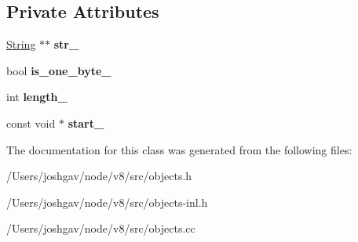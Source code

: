 \subsection*{Private Attributes}
\begin{DoxyCompactItemize}
\item 
\hyperlink{classv8_1_1internal_1_1_string}{String} $\ast$$\ast$ {\bfseries str\+\_\+}\hypertarget{classv8_1_1internal_1_1_flat_string_reader_a6a9b34e1e6fc9c1cf385932fa4fe452c}{}\label{classv8_1_1internal_1_1_flat_string_reader_a6a9b34e1e6fc9c1cf385932fa4fe452c}

\item 
bool {\bfseries is\+\_\+one\+\_\+byte\+\_\+}\hypertarget{classv8_1_1internal_1_1_flat_string_reader_a0679192f9ea46ae9d76b6c3af5a365e1}{}\label{classv8_1_1internal_1_1_flat_string_reader_a0679192f9ea46ae9d76b6c3af5a365e1}

\item 
int {\bfseries length\+\_\+}\hypertarget{classv8_1_1internal_1_1_flat_string_reader_a2418d25a56bebb00d3b71e0c65ecf88a}{}\label{classv8_1_1internal_1_1_flat_string_reader_a2418d25a56bebb00d3b71e0c65ecf88a}

\item 
const void $\ast$ {\bfseries start\+\_\+}\hypertarget{classv8_1_1internal_1_1_flat_string_reader_a7cde379222e1f1c63eca0b97223138a1}{}\label{classv8_1_1internal_1_1_flat_string_reader_a7cde379222e1f1c63eca0b97223138a1}

\end{DoxyCompactItemize}


The documentation for this class was generated from the following files\+:\begin{DoxyCompactItemize}
\item 
/\+Users/joshgav/node/v8/src/objects.\+h\item 
/\+Users/joshgav/node/v8/src/objects-\/inl.\+h\item 
/\+Users/joshgav/node/v8/src/objects.\+cc\end{DoxyCompactItemize}
